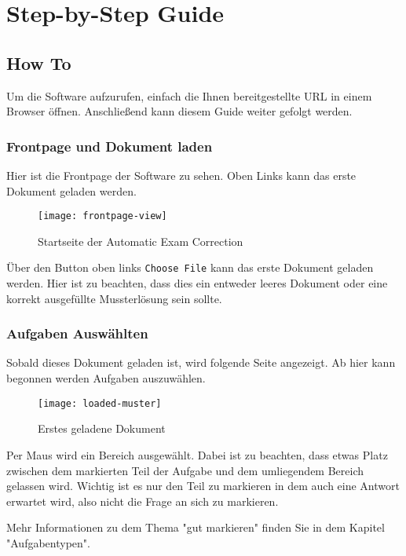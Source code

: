 \author{Tadd\"aus Nauheimer}
\chapter{Step-by-Step Guide}

\section{How To}
Um die Software aufzurufen, einfach die Ihnen bereitgestellte URL in einem Browser \"offnen.
Anschließend kann diesem Guide weiter gefolgt werden.

\subsection{Frontpage und Dokument laden}

Hier ist die Frontpage der Software zu sehen.
Oben Links kann das erste Dokument geladen werden.

\begin{figure}[H]
    \centering
    \texttt{[image: frontpage-view]}
    \caption{Startseite der Automatic Exam Correction}
\end{figure}

\"Uber den Button oben links \texttt{Choose File} kann das erste Dokument geladen werden.
Hier ist zu beachten, dass dies ein entweder leeres Dokument oder eine korrekt ausgef\"ullte Mussterl\"osung sein sollte.

\subsection{Aufgaben Ausw\"ahlten}

Sobald dieses Dokument geladen ist, wird folgende Seite angezeigt.
Ab hier kann begonnen werden Aufgaben auszuw\"ahlen.

\begin{figure}[H]
\centering
\texttt{[image: loaded-muster]}
    \caption{Erstes geladene Dokument}
\end{figure}

Per Maus wird ein Bereich ausgew\"ahlt.
Dabei ist zu beachten, dass etwas Platz zwischen dem markierten Teil der Aufgabe und dem umliegendem Bereich gelassen wird.
Wichtig ist es nur den Teil zu markieren in dem auch eine Antwort erwartet wird, also nicht die Frage an sich zu markieren.

Mehr Informationen zu dem Thema "gut markieren" finden Sie in dem Kapitel "Aufgabentypen".


